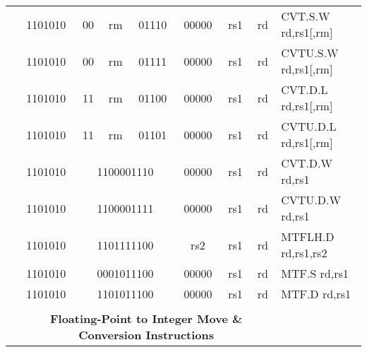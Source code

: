 \begin{table}[p]
\begin{small}
\begin{center}
\begin{tabular}{rcccccccccl}
&
\multicolumn{1}{|c|}{1101010} &
\multicolumn{1}{c|}{00} &
\multicolumn{2}{c|}{rm} &
\multicolumn{2}{c|}{01110} &
\multicolumn{1}{c|}{00000} &
\multicolumn{1}{c|}{rs1} &
\multicolumn{1}{c|}{rd} & CVT.S.W rd,rs1[,rm] \\
\cline{2-10}
  

&
\multicolumn{1}{|c|}{1101010} &
\multicolumn{1}{c|}{00} &
\multicolumn{2}{c|}{rm} &
\multicolumn{2}{c|}{01111} &
\multicolumn{1}{c|}{00000} &
\multicolumn{1}{c|}{rs1} &
\multicolumn{1}{c|}{rd} & CVTU.S.W rd,rs1[,rm] \\
\cline{2-10}
  

&
\multicolumn{1}{|c|}{1101010} &
\multicolumn{1}{c|}{11} &
\multicolumn{2}{c|}{rm} &
\multicolumn{2}{c|}{01100} &
\multicolumn{1}{c|}{00000} &
\multicolumn{1}{c|}{rs1} &
\multicolumn{1}{c|}{rd} & CVT.D.L rd,rs1[,rm] \\
\cline{2-10}
  

&
\multicolumn{1}{|c|}{1101010} &
\multicolumn{1}{c|}{11} &
\multicolumn{2}{c|}{rm} &
\multicolumn{2}{c|}{01101} &
\multicolumn{1}{c|}{00000} &
\multicolumn{1}{c|}{rs1} &
\multicolumn{1}{c|}{rd} & CVTU.D.L rd,rs1[,rm] \\
\cline{2-10}
  

&
\multicolumn{1}{|c|}{1101010} &
\multicolumn{5}{c|}{1100001110} &
\multicolumn{1}{c|}{00000} &
\multicolumn{1}{c|}{rs1} &
\multicolumn{1}{c|}{rd} & CVT.D.W rd,rs1 \\
\cline{2-10}
  

&
\multicolumn{1}{|c|}{1101010} &
\multicolumn{5}{c|}{1100001111} &
\multicolumn{1}{c|}{00000} &
\multicolumn{1}{c|}{rs1} &
\multicolumn{1}{c|}{rd} & CVTU.D.W rd,rs1 \\
\cline{2-10}
  

&
\multicolumn{1}{|c|}{1101010} &
\multicolumn{5}{c|}{1101111100} &
\multicolumn{1}{c|}{rs2} &
\multicolumn{1}{c|}{rs1} &
\multicolumn{1}{c|}{rd} & MTFLH.D rd,rs1,rs2 \\
\cline{2-10}
  

&
\multicolumn{1}{|c|}{1101010} &
\multicolumn{5}{c|}{0001011100} &
\multicolumn{1}{c|}{00000} &
\multicolumn{1}{c|}{rs1} &
\multicolumn{1}{c|}{rd} & MTF.S rd,rs1 \\
\cline{2-10}
  

&
\multicolumn{1}{|c|}{1101010} &
\multicolumn{5}{c|}{1101011100} &
\multicolumn{1}{c|}{00000} &
\multicolumn{1}{c|}{rs1} &
\multicolumn{1}{c|}{rd} & MTF.D rd,rs1 \\
\cline{2-10}
  

&
\multicolumn{9}{c}{} & \\
&
\multicolumn{9}{c}{\bf Floating-Point to Integer Move \& Conversion Instructions} & \\
\cline{2-10}
  


\end{tabular}
\end{center}
\end{small}
\end{table}
